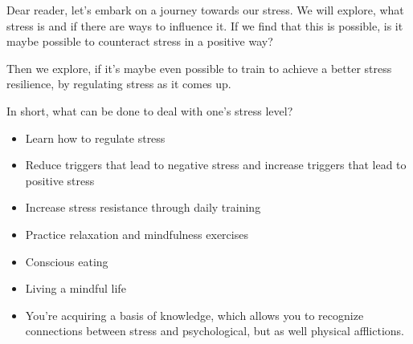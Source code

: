 \documentclass[../main.tex]{subfiles}
\begin{document}
Dear reader, let's embark on a journey towards our stress. We will explore, what stress is and if there are ways to influence it. If we find that this is possible, is it maybe possible to counteract stress in a positive way?

Then we explore, if it's maybe even possible to train to achieve a better stress resilience, by regulating stress as it comes up.

In short, what can be done to deal with one's stress level?

\begin{itemize}
\item Learn how to {regulate stress}
\item Reduce triggers that lead to {negative stress} and increase triggers that lead to {positive stress}
\item Increase {stress resistance} through daily training
\item Practice {relaxation} and {mindfulness} exercises
\item {Conscious eating}
\item Living a {mindful life}
\item You're acquiring a basis of knowledge, which allows you to recognize connections between stress and psychological, but as well physical afflictions.
  \end{itemize}
 
\end{document}
